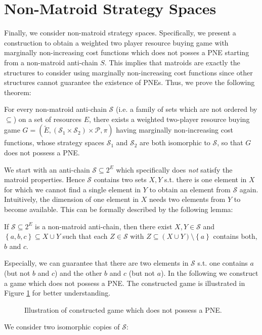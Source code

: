 \documentclass{scrartcl}
\theoremstyle{nonumberplain}
\newcommand{\tupel}[1]{\left(#1\right)}
\newcommand{\set}[1]{\left\{#1\right\}}
\begin{document}
\section{Non-Matroid Strategy Spaces}
Finally, we consider non-matroid strategy spaces. Specifically,
we present a construction to obtain a weighted two player
resource buying game with marginally non-increasing cost functions which does
not posses a PNE starting from a non-matroid anti-chain $S$. This implies that
matroids are exactly the structures to consider using marginally non-increasing
cost functions since other structures cannot guarantee the existence of PNEs.
Thus, we prove the following theorem:
\begin{theo}
  For every non-matroid anti-chain $\mathcal{S}$ (i.e. a family of sets which
  are not ordered by $\subseteq$) on a set of resources $E$, there exists a
  weighted two-player resource buying game $G = \tupel{\tilde{E},
    (\mathcal{S}_{1}\times \mathcal{S}_{2})\times\mathcal{P},\pi}$
  having marginally non-increasing cost functions, whose strategy spaces
  $\mathcal{S}_{1}$ and $\mathcal{S}_{2}$ are both isomorphic to $\mathcal{S}$,
  so that $G$ does not possess a PNE.
\end{theo}
We start with an anti-chain $\mathcal{S}\subseteq 2^{E}$ which
specifically does \emph{not} satisfy the matroid properties. Hence
$\mathcal{S}$ contains two sets $X, Y$ s.t. there is one element in $X$ for
which we cannot find a single element in $Y$ to obtain an element from
$\mathcal{S}$ again. Intuitively, the dimension of one element in $X$ needs
two elements from $Y$ to become available. This can be formally described
by the following lemma:
\begin{lemma}
  If $\mathcal{S}\subseteq 2^{E}$ is a non-matroid anti-chain, then there exist
  $X,Y\in\mathcal{S}$ and $\set{a,b,c}\subseteq X\cup Y$ such that each
  $Z\in\mathcal{S}$ with $Z\subseteq(X\cup Y)\setminus\set{a}$ contains both,
  $b$ and $c$.
\end{lemma}
Especially, we can guarantee that there are two elements in $\mathcal{S}$ s.t.
one contains $a$ (but not $b$ and $c$) and the other $b$ and $c$ (but not $a$).
In the following we construct a game which does not possess a PNE. The
constructed game is illustrated in Figure \ref{fig:game} for better
understanding.
\begin{figure}
  
  \caption{Illustration of constructed game which does not possess a PNE.}
  \label{fig:game}
\end{figure}
We consider two isomorphic copies of $\mathcal{S}$:
\end{document}
